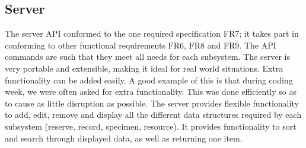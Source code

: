 \subsection{Server}
 
The server API conformed to the one required specification FR7; it takes part in conforming to other functional requirements FR6, FR8 and FR9. The API commands are such that they meet all needs for each subsystem. The server is very portable and extensible, making it ideal for real world situations. Extra functionality can be added easily. A good example of this is that during coding week, we were often asked for extra functionality. This was done efficiently so as to cause as little disruption as possible. The server provides flexible functionality to add, edit, remove and display all the different data structures required by each subsystem (reserve, record, specimen, resource). It provides functionality to sort and search through displayed data, as well as returning one item. 

